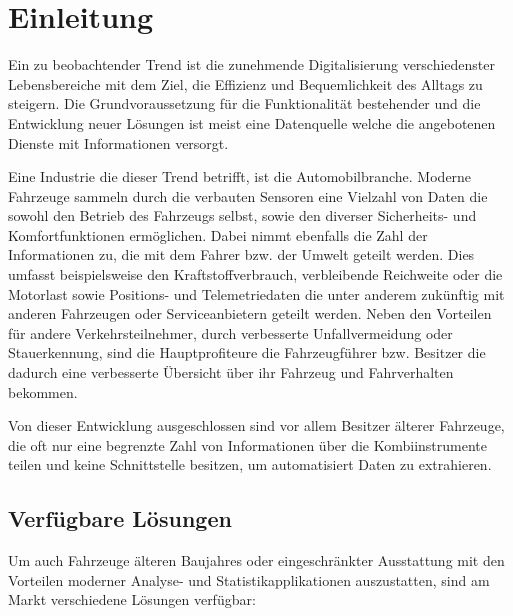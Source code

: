\chapter{Einleitung}
Ein zu beobachtender Trend ist die zunehmende Digitalisierung verschiedenster Lebensbereiche mit dem Ziel, die Effizienz und Bequemlichkeit des Alltags zu steigern. Die Grundvoraussetzung für die Funktionalität bestehender und die Entwicklung neuer Lösungen ist meist eine Datenquelle welche die angebotenen Dienste mit Informationen versorgt. 

Eine Industrie die dieser Trend betrifft, ist die Automobilbranche. Moderne Fahrzeuge sammeln durch die verbauten Sensoren eine Vielzahl von Daten die sowohl den Betrieb des Fahrzeugs selbst, sowie den diverser Sicherheits- und Komfortfunktionen ermöglichen. Dabei nimmt ebenfalls die Zahl der Informationen zu, die mit dem Fahrer bzw. der Umwelt geteilt werden. Dies umfasst beispielsweise den Kraftstoffverbrauch, verbleibende Reichweite oder die Motorlast sowie Positions- und Telemetriedaten die unter anderem zukünftig mit anderen Fahrzeugen oder Serviceanbietern geteilt werden. Neben den Vorteilen für andere Verkehrsteilnehmer, durch verbesserte Unfallvermeidung oder Stauerkennung, sind die Hauptprofiteure die Fahrzeugführer bzw. Besitzer die dadurch eine verbesserte Übersicht über ihr Fahrzeug und Fahrverhalten bekommen.

Von dieser Entwicklung ausgeschlossen sind vor allem Besitzer älterer Fahrzeuge, die oft nur eine begrenzte Zahl von Informationen über die Kombiinstrumente teilen und keine Schnittstelle besitzen, um automatisiert Daten zu extrahieren. 

\section{Verfügbare Lösungen}
\label{sec:solutions}
Um auch Fahrzeuge älteren Baujahres oder eingeschränkter Ausstattung mit den Vorteilen moderner Analyse- und Statistikapplikationen auszustatten, sind am Markt verschiedene Lösungen verfügbar:

